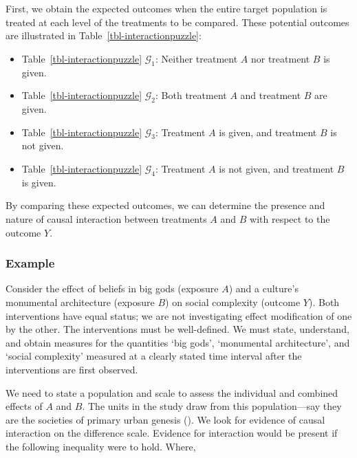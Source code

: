\documentclass[
  single column]{article}
\providecommand{\tightlist}{%
  \setlength{\itemsep}{0pt}\setlength{\parskip}{0pt}}\usepackage{longtable,booktabs,array}
\begin{document}
First, we obtain the expected outcomes when the entire target population
is treated at each level of the treatments to be compared. These
potential outcomes are illustrated in Table~\ref{tbl-interactionpuzzle}:

\begin{itemize}
\tightlist
\item
  Table~\ref{tbl-interactionpuzzle} \(\mathcal{G}_1\): Neither treatment
  \(A\) nor treatment \(B\) is given.
\item
  Table~\ref{tbl-interactionpuzzle} \(\mathcal{G}_2\): Both treatment
  \(A\) and treatment \(B\) are given.
\item
  Table~\ref{tbl-interactionpuzzle} \(\mathcal{G}_3\): Treatment \(A\)
  is given, and treatment \(B\) is not given.
\item
  Table~\ref{tbl-interactionpuzzle} \(\mathcal{G}_4\): Treatment \(A\)
  is not given, and treatment \(B\) is given.
\end{itemize}

By comparing these expected outcomes, we can determine the presence and
nature of causal interaction between treatments \(A\) and \(B\) with
respect to the outcome \(Y\).

\begin{table}

\caption{\label{tbl-interactionpuzzle}}

\centering{

\captionsetup{labelsep=none}

\interactionpuzzle

}

\end{table}%

\subsubsection{Example}\label{example}

Consider the effect of beliefs in big gods (exposure \(A\)) and a
culture's monumental architecture (exposure \(B\)) on social complexity
(outcome \(Y\)). Both interventions have equal status; we are not
investigating effect modification of one by the other. The interventions
must be well-defined. We must state, understand, and obtain measures for
the quantities `big gods', `monumental architecture', and `social
complexity' measured at a clearly stated time interval after the
interventions are first observed.

We need to state a population and scale to assess the individual and
combined effects of \(A\) and \(B\). The units in the study draw from
this population---say they are the societies of primary urban genesis
(). We look for evidence
of causal interaction on the difference scale. Evidence for interaction
would be present if the following inequality were to hold. Where,
\end{document}
